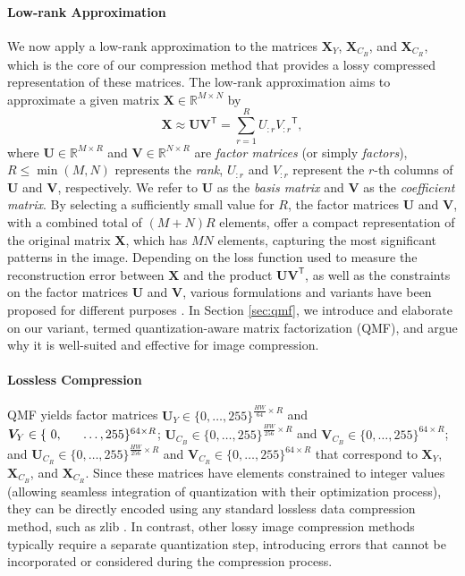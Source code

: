 \paragraph{Low-rank Approximation}
We now apply a low-rank approximation to the matrices $\bm{X}_{Y}$, $\bm{X}_{C_B}$, and $\bm{X}_{C_R}$, which is the core of our compression method that provides a lossy compressed representation of these matrices.  The low-rank approximation \cite{eckart1936approximation} aims to approximate a given matrix $ \bm{X} \in \mathbb{R}^{M \times N} $ by
\begin{equation} \label{eq:lra}
    \bm{X} \approx \bm{U} \bm{V}^\mathsf{T} = \sum_{r=1}^{R} U_{:r} {V_{:r}}^\mathsf{T},
\end{equation}
where $\bm{U} \in \mathbb{R}^{M \times R}$ and $\bm{V} \in \mathbb{R}^{N \times R}$ are \emph{factor matrices} (or simply \emph{factors}), $R \leq \min(M,N)$ represents the \emph{rank}, $U_{:r}$ and $V_{:r}$ represent the $r$-th columns of $\bm{U}$ and $\bm{V}$, respectively. We refer to $\bm{U}$ as the \emph{basis matrix} and $\bm{V}$ as the \emph{coefficient matrix}. By selecting a sufficiently small value for $R$, the factor matrices $\bm{U}$ and $\bm{V}$, with a combined total of $(M+N)R$ elements, offer a compact representation of the original matrix $\bm{X}$, which has $MN$ elements, capturing the most significant patterns in the image. Depending on the loss function used to measure the reconstruction error between $\bm{X}$ and the product $\bm{U} \bm{V}^\mathsf{T}$, as well as the constraints on the factor matrices $\bm{U}$ and $\bm{V}$, various formulations and variants have been proposed for different purposes \cite{lee2000algorithms, ding2008convex, lin2005integer}. In Section \ref{sec:qmf}, we introduce and elaborate on our variant, termed quantization-aware matrix factorization (QMF), and argue why it is well-suited and effective for image compression.


\paragraph{Lossless Compression}
QMF yields factor matrices $\bm{U}_{Y} \in \{0, \ldots, 255\}^{\frac{HW}{64} \times R}$ and $\bm{V}_{Y} \in \{~0,~~~~~ \ldots\\, 255\}^{64 \times R}$; $\bm{U}_{C_B} \in \{0, \ldots, 255\}^{\frac{HW}{256} \times R}$ and $\bm{V}_{C_B} \in \{0, \ldots, 255\}^{64 \times R}$; and $\bm{U}_{C_R} \in \{0, \ldots, 255\}^{\frac{HW}{256} \times R}$ and $\bm{V}_{C_R} \in \{0, \ldots, 255\}^{64 \times R}$ that correspond to $\bm{X}_{Y}$, $\bm{X}_{C_B}$, and $\bm{X}_{C_R}$. Since these matrices have elements constrained to integer values (allowing seamless integration of quantization with their optimization process), they can be directly encoded using any standard lossless data compression method, such as zlib \cite{deutsch1996zlib}. In contrast, other lossy image compression methods typically require a separate quantization step, introducing errors that cannot be incorporated or considered during the compression process.

